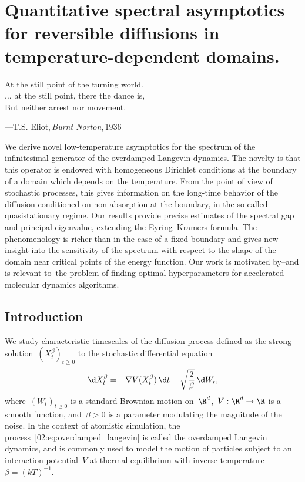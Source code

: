 \chapter{Quantitative spectral asymptotics for reversible diffusions in temperature-dependent domains.}
\label{02:chap:semiclassic}
    \epigraph{At the still point of the turning world.\\
    $\dots$ at the still point, there the dance is,\\
But neither arrest nor movement.}{---T.S. Eliot,\,\textit{Burnt Norton},\,1936}
    \begin{chapterabstract}
    We derive novel low-temperature asymptotics for the spectrum of the infinitesimal generator of the overdamped Langevin dynamics. The novelty is that this operator is endowed with homogeneous Dirichlet conditions at the boundary of a domain which depends on the temperature. From the point of view of stochastic processes, this gives information on the long-time behavior of the diffusion conditioned on non-absorption at the boundary, in the so-called quasistationary regime. Our results provide precise estimates of the spectral gap and principal eigenvalue, extending the Eyring--Kramers formula. The phenomenology is richer than in the case of a fixed boundary and gives new insight into the sensitivity of the spectrum with respect to the shape of the domain near critical points of the energy function. Our work is motivated by--and is relevant to--the problem of finding optimal hyperparameters for accelerated molecular dynamics algorithms.
    \end{chapterabstract}

    \section{Introduction}
    \label{02:sec:intro}
    We study characteristic timescales of the diffusion process defined as the strong solution~$(X^{\beta}_t)_{t\geq 0}$ to the stochastic differential equation
    \begin{equation}
        \label{02:eq:overdamped_langevin}
        \d X^{\beta}_{t} = -\nabla V(X^{\beta}_{t})\,\d t + \sqrt{\frac2\beta}\, \d W_t,
    \end{equation}
    where~$(W_t)_{t\geq 0}$ is a standard Brownian motion on~$\R^d$,~$V:\R^d \to \R$ is a smooth function, and~$\beta>0$ is a parameter modulating the magnitude of the noise.
    In the context of atomistic simulation, the process~\eqref{02:eq:overdamped_langevin} is called the overdamped Langevin dynamics, and is commonly used to model the motion of particles subject to an interaction potential~$V$ at thermal equilibrium with inverse temperature~$\beta=(kT)^{-1}$.
    
